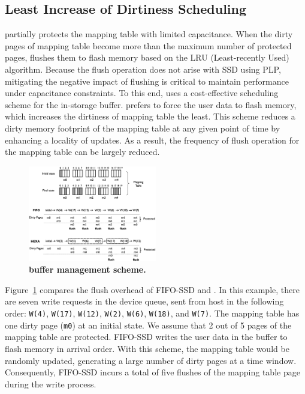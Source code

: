\subsection{Least Increase of Dirtiness Scheduling}
\label{subsec:lind_sched}
\fi
\ours{} partially protects the mapping table with limited capacitance. 
When the dirty pages of mapping table become more than the maximum number of protected pages, 
\ours{} flushes them to flash memory based on the LRU (Least-recently Used) algorithm. 
Because the flush operation does not arise with SSD using PLP, mitigating the negative impact of  flushing is critical to maintain performance under capacitance constraints. 
To this end, \ours{} uses a cost-effective scheduling scheme for the in-storage buffer.
\ours{} prefers to force the user data to flash memory, which increases the dirtiness of mapping table the least. This scheme reduces a dirty memory footprint 
of the mapping table at any given point of time by enhancing a locality of updates. 
As a result, the frequency of flush operation for the mapping table can be 
largely reduced. 

\begin{figure}
    \centering{}
    \includegraphics[width=0.5\textwidth]{figure/dawid_algo.eps}
    \caption{\textbf{\ours{} buffer management scheme.}}
    \label{fig:dawid_buff_overview}
\end{figure}

Figure~\ref{fig:dawid_buff_overview} compares the flush overhead of FIFO-SSD and \ours{}. 
In this example, there are seven write requests 
in the device queue, sent from host in the following order: \texttt{W(4)}, \texttt{W(17)}, \texttt{W(12)}, \texttt{W(2)}, \texttt{W(6)}, \texttt{W(18)}, and \texttt{W(7)}.  
The mapping table has one dirty page (\texttt{m0}) 
at an initial state. We assume that 2 out of 5 pages of the mapping table are protected. 
FIFO-SSD writes the user data in the buffer to flash memory in arrival order. 
With this scheme, the mapping table would be randomly updated, generating a large number of dirty pages at a 
time window. 
Consequently, FIFO-SSD incurs a total of five flushes of the mapping table page during the write process. 


